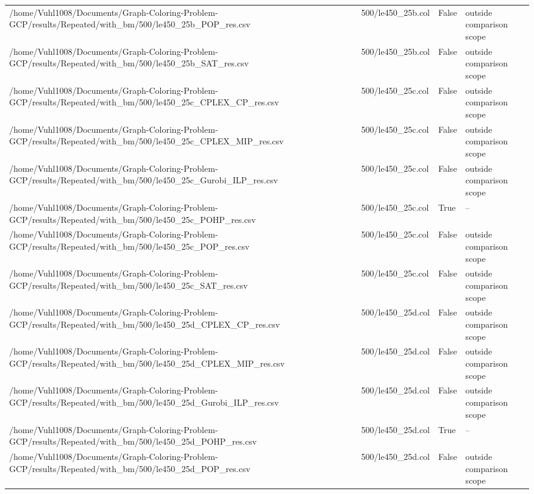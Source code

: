 \begin{table}[htbp]
\begin{tabular}{llll}
/home/Vuhl1008/Documents/Graph-Coloring-Problem-GCP/results/Repeated/with\_bm/500/le450\_25b\_POP\_res.csv & 500/le450\_25b.col & False & outside comparison scope \\
/home/Vuhl1008/Documents/Graph-Coloring-Problem-GCP/results/Repeated/with\_bm/500/le450\_25b\_SAT\_res.csv & 500/le450\_25b.col & False & outside comparison scope \\
/home/Vuhl1008/Documents/Graph-Coloring-Problem-GCP/results/Repeated/with\_bm/500/le450\_25c\_CPLEX\_CP\_res.csv & 500/le450\_25c.col & False & outside comparison scope \\
/home/Vuhl1008/Documents/Graph-Coloring-Problem-GCP/results/Repeated/with\_bm/500/le450\_25c\_CPLEX\_MIP\_res.csv & 500/le450\_25c.col & False & outside comparison scope \\
/home/Vuhl1008/Documents/Graph-Coloring-Problem-GCP/results/Repeated/with\_bm/500/le450\_25c\_Gurobi\_ILP\_res.csv & 500/le450\_25c.col & False & outside comparison scope \\
/home/Vuhl1008/Documents/Graph-Coloring-Problem-GCP/results/Repeated/with\_bm/500/le450\_25c\_POHP\_res.csv & 500/le450\_25c.col & True & -- \\
/home/Vuhl1008/Documents/Graph-Coloring-Problem-GCP/results/Repeated/with\_bm/500/le450\_25c\_POP\_res.csv & 500/le450\_25c.col & False & outside comparison scope \\
/home/Vuhl1008/Documents/Graph-Coloring-Problem-GCP/results/Repeated/with\_bm/500/le450\_25c\_SAT\_res.csv & 500/le450\_25c.col & False & outside comparison scope \\
/home/Vuhl1008/Documents/Graph-Coloring-Problem-GCP/results/Repeated/with\_bm/500/le450\_25d\_CPLEX\_CP\_res.csv & 500/le450\_25d.col & False & outside comparison scope \\
/home/Vuhl1008/Documents/Graph-Coloring-Problem-GCP/results/Repeated/with\_bm/500/le450\_25d\_CPLEX\_MIP\_res.csv & 500/le450\_25d.col & False & outside comparison scope \\
/home/Vuhl1008/Documents/Graph-Coloring-Problem-GCP/results/Repeated/with\_bm/500/le450\_25d\_Gurobi\_ILP\_res.csv & 500/le450\_25d.col & False & outside comparison scope \\
/home/Vuhl1008/Documents/Graph-Coloring-Problem-GCP/results/Repeated/with\_bm/500/le450\_25d\_POHP\_res.csv & 500/le450\_25d.col & True & -- \\
/home/Vuhl1008/Documents/Graph-Coloring-Problem-GCP/results/Repeated/with\_bm/500/le450\_25d\_POP\_res.csv & 500/le450\_25d.col & False & outside comparison scope \\

\end{tabular}
\end{table}
